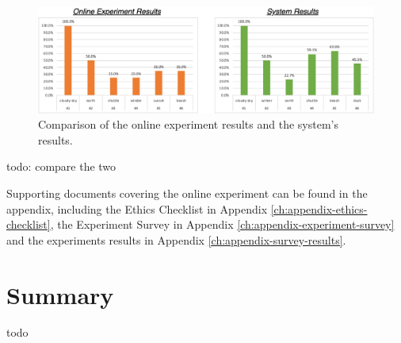 \begin{figure}[h] 
\centerline{\includegraphics[width=\textwidth]{figures/evaluation/ground_truth_vs_system_results.png}}
\caption{\label{fig:evaluation-ground_truth_vs_system_results}Comparison of the online experiment results and the system's results.}
\end{figure}

todo: compare the two

Supporting documents covering the online experiment can be found in the appendix, including the Ethics Checklist in Appendix \ref{ch:appendix-ethics-checklist}, the Experiment Survey in Appendix \ref{ch:appendix-experiment-survey} and the experiments results in Appendix \ref{ch:appendix-survey-results}.


\section{Summary}

todo